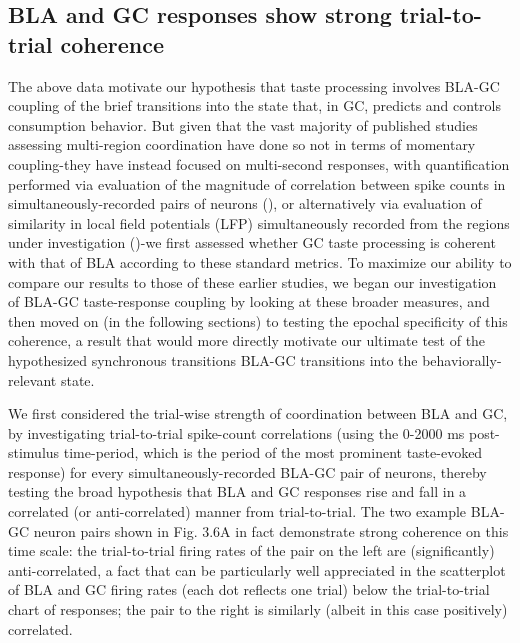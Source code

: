 \begin{refsection}
\subsection{BLA and GC responses show strong trial-to-trial coherence}
The above data motivate our hypothesis that taste processing involves BLA-GC coupling of the brief transitions into the state that, in GC, predicts and controls consumption behavior. But given that the vast majority of published studies assessing multi-region coordination have done so not in terms of momentary coupling-they have instead focused on multi-second responses, with quantification performed via evaluation of the magnitude of correlation between spike counts in simultaneously-recorded pairs of neurons (\cite{averbeck2006a,averbeck2006b}), or alternatively via evaluation of similarity in local field potentials (LFP) simultaneously recorded from the regions under investigation (\cite{place2016a})-we first assessed whether GC taste processing is coherent with that of BLA according to these standard metrics. To maximize our ability to compare our results to those of these earlier studies, we began our investigation of BLA-GC taste-response coupling by looking at these broader measures, and then moved on (in the following sections) to testing the epochal specificity of this coherence, a result that would more directly motivate our ultimate test of the hypothesized synchronous transitions BLA-GC transitions into the behaviorally-relevant state.

We first considered the trial-wise strength of coordination between BLA and GC, by investigating trial-to-trial spike-count correlations (using the 0-2000 ms post-stimulus time-period, which is the period of the most prominent taste-evoked response) for every simultaneously-recorded BLA-GC pair of neurons, thereby testing the broad hypothesis that BLA and GC responses rise and fall in a correlated (or anti-correlated) manner from trial-to-trial. The two example BLA-GC neuron pairs shown in Fig. 3.6A in fact demonstrate strong coherence on this time scale: the trial-to-trial firing rates of the pair on the left are (significantly) anti-correlated, a fact that can be particularly well appreciated in the scatterplot of BLA and GC firing rates (each dot reflects one trial) below the trial-to-trial chart of responses; the pair to the right is similarly (albeit in this case positively) correlated. 


\end{refsection}
